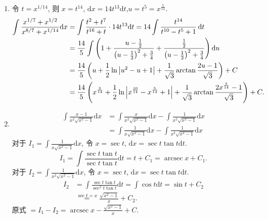 \begin{solution}
\begin{enumerate}
        \item %
              令 $t = x^{1/14}$, 则 $x = t^{14}$, $\mathrm{d}x = 14 t^{13} \mathrm{d}t$,$u = t^5 = x^{\frac{5}{14}}$.
              \begin{align*}
                  \int \frac{x^{1/7} + x^{1/2}}{x^{8/7} + x^{1/14}} \mathrm{d}x & = \int \frac{t^2 + t^7}{t^{16} + t} \cdot 14 t^{13} \mathrm{d}t = 14 \int \frac{t^{14}}{t^{10}-t^5+1} \operatorname{d\!} t \\
                  &=\frac{14}{5}\int \left( 1 + \frac{u - \frac{1}{2}}{\left(u - \frac{1}{2}\right)^2 + \frac{3}{4}} + \frac{\frac{1}{2}}{\left(u- \frac12\right)^2 + \frac{3}{4}} \right) \operatorname{d\!} u \\
                  &=\frac{14}{5} \left( u + \frac{1}{2} \ln \left| u^2 - u + 1 \right| + \frac{1}{\sqrt 3} \arctan \frac{2u - 1}{\sqrt 3} \right) + C \\
                  &=\frac{14}{5} \left( x^{\frac{5}{14}} + \frac{1}{2} \ln \left| x^{\frac{10}{14}} - x^{\frac{5}{14}} + 1 \right| + \frac{1}{\sqrt 3} \arctan \frac{2x^{\frac{5}{14}} - 1}{\sqrt 3} \right) + C.
              \end{align*}
        \item %
              \begin{align*}
                  \int \frac{x - 1}{x^2 \sqrt{x^2 - 1}} \mathrm{d}x & = \int \frac{x}{x^2 \sqrt{x^2 - 1}} \mathrm{d}x - \int \frac{1}{x^2 \sqrt{x^2 - 1}} \mathrm{d}x \\
                                                                    & = \int \frac{1}{x \sqrt{x^2 - 1}} \mathrm{d}x - \int \frac{1}{x^2 \sqrt{x^2 - 1}} \mathrm{d}x
              \end{align*}
              对于 $I_1 = \int \frac{1}{x \sqrt{x^2 - 1}} \mathrm{d}x$, 令 $x = \sec t$, $\mathrm{d}x = \sec t \tan t \mathrm{d}t$.
              $$ I_1 = \int \frac{\sec t \tan t}{\sec t \tan t} \mathrm{d}t = t + C_1 = \operatorname{arcsec} x + C_1. $$
              对于 $I_2 = \int \frac{1}{x^2 \sqrt{x^2 - 1}} \mathrm{d}x$, 令 $x = \sec t$, $\mathrm{d}x = \sec t \tan t \mathrm{d}t$.
              \begin{align*}
                  I_2 & = \int \frac{\sec t \tan t}{\sec^2 t \tan t} \mathrm{d}t = \int \cos t \mathrm{d}t = \sin t + C_2 \\
                      & \overset{\sec t = x}{=} \frac{\sqrt{x^2 - 1}}{x} + C_2.
              \end{align*}
              原式 $= I_1 - I_2 = \operatorname{arcsec} x - \frac{\sqrt{x^2 - 1}}{x} + C$.


\end{enumerate}
\end{solution}
